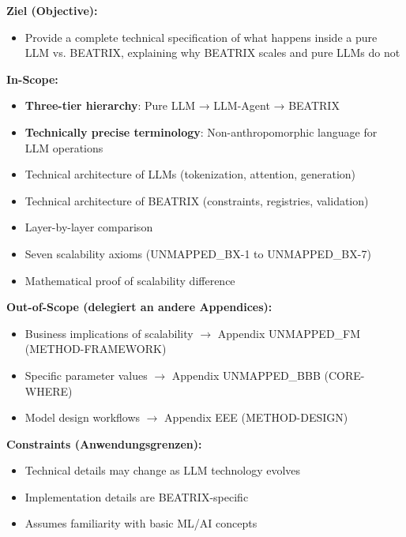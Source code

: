 \begin{tcolorbox}[
    colback=orange!5!white,
    colframe=orange!75!black,
    title={\textbf{Appendix Scope: Ziel / In-Scope / Out-of-Scope / Constraints}},
    fonttitle=\bfseries
]

\textbf{Ziel (Objective):}
\begin{itemize}[nosep]
    \item Provide a complete technical specification of what happens inside a pure LLM vs. BEATRIX, explaining why BEATRIX scales and pure LLMs do not
\end{itemize}

\textbf{In-Scope:}
\begin{itemize}[nosep]
    \item \textbf{Three-tier hierarchy}: Pure LLM → LLM-Agent → BEATRIX
    \item \textbf{Technically precise terminology}: Non-anthropomorphic language for LLM operations
    \item Technical architecture of LLMs (tokenization, attention, generation)
    \item Technical architecture of BEATRIX (constraints, registries, validation)
    \item Layer-by-layer comparison
    \item Seven scalability axioms (UNMAPPED_BX-1 to UNMAPPED_BX-7)
    \item Mathematical proof of scalability difference
\end{itemize}

\textbf{Out-of-Scope (delegiert an andere Appendices):}
\begin{itemize}[nosep]
    \item Business implications of scalability $\rightarrow$ Appendix UNMAPPED_FM (METHOD-FRAMEWORK)
    \item Specific parameter values $\rightarrow$ Appendix UNMAPPED_BBB (CORE-WHERE)
    \item Model design workflows $\rightarrow$ Appendix EEE (METHOD-DESIGN)
\end{itemize}

\textbf{Constraints (Anwendungsgrenzen):}
\begin{itemize}[nosep]
    \item Technical details may change as LLM technology evolves
    \item Implementation details are BEATRIX-specific
    \item Assumes familiarity with basic ML/AI concepts
\end{itemize}


\end{tcolorbox}
